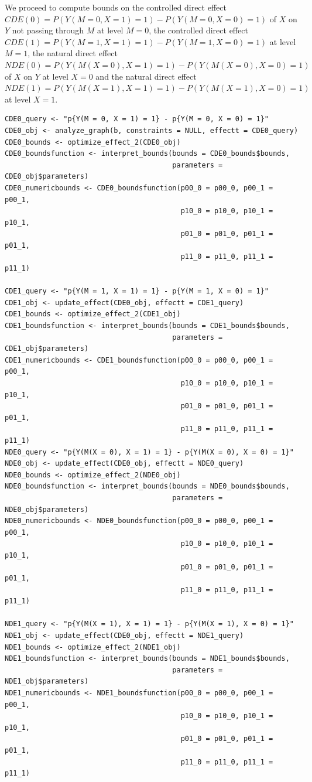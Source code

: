 We proceed to compute bounds on the controlled direct effect \(CDE(0) = P(Y(M = 0, X = 1) = 1) - P(Y(M = 0, X = 0) = 1)\) of \(X\) on \(Y\) not passing through \(M\) at level \(M=0\), the controlled direct effect \(CDE(1) = P(Y(M = 1, X = 1) = 1) - P(Y(M = 1, X = 0) = 1)\) at level \(M=1\), the natural direct effect \(NDE(0) = P(Y(M(X = 0), X = 1) = 1) - P(Y(M(X = 0), X = 0) = 1)\) of \(X\) on \(Y\) at level \(X=0\) and the natural direct effect \(NDE(1) = P(Y(M(X = 1), X = 1) = 1) - P(Y(M(X = 1), X = 0) = 1)\) at level \(X=1\).

\begin{verbatim}
CDE0_query <- "p{Y(M = 0, X = 1) = 1} - p{Y(M = 0, X = 0) = 1}"
CDE0_obj <- analyze_graph(b, constraints = NULL, effectt = CDE0_query)
CDE0_bounds <- optimize_effect_2(CDE0_obj)
CDE0_boundsfunction <- interpret_bounds(bounds = CDE0_bounds$bounds, 
                                        parameters = CDE0_obj$parameters)
CDE0_numericbounds <- CDE0_boundsfunction(p00_0 = p00_0, p00_1 = p00_1, 
                                          p10_0 = p10_0, p10_1 = p10_1, 
                                          p01_0 = p01_0, p01_1 = p01_1, 
                                          p11_0 = p11_0, p11_1 = p11_1)

CDE1_query <- "p{Y(M = 1, X = 1) = 1} - p{Y(M = 1, X = 0) = 1}"
CDE1_obj <- update_effect(CDE0_obj, effectt = CDE1_query)
CDE1_bounds <- optimize_effect_2(CDE1_obj)
CDE1_boundsfunction <- interpret_bounds(bounds = CDE1_bounds$bounds, 
                                        parameters = CDE1_obj$parameters)
CDE1_numericbounds <- CDE1_boundsfunction(p00_0 = p00_0, p00_1 = p00_1, 
                                          p10_0 = p10_0, p10_1 = p10_1, 
                                          p01_0 = p01_0, p01_1 = p01_1, 
                                          p11_0 = p11_0, p11_1 = p11_1)
NDE0_query <- "p{Y(M(X = 0), X = 1) = 1} - p{Y(M(X = 0), X = 0) = 1}"
NDE0_obj <- update_effect(CDE0_obj, effectt = NDE0_query)
NDE0_bounds <- optimize_effect_2(NDE0_obj)
NDE0_boundsfunction <- interpret_bounds(bounds = NDE0_bounds$bounds, 
                                        parameters = NDE0_obj$parameters)
NDE0_numericbounds <- NDE0_boundsfunction(p00_0 = p00_0, p00_1 = p00_1, 
                                          p10_0 = p10_0, p10_1 = p10_1, 
                                          p01_0 = p01_0, p01_1 = p01_1, 
                                          p11_0 = p11_0, p11_1 = p11_1)

NDE1_query <- "p{Y(M(X = 1), X = 1) = 1} - p{Y(M(X = 1), X = 0) = 1}"
NDE1_obj <- update_effect(CDE0_obj, effectt = NDE1_query)
NDE1_bounds <- optimize_effect_2(NDE1_obj)
NDE1_boundsfunction <- interpret_bounds(bounds = NDE1_bounds$bounds, 
                                        parameters = NDE1_obj$parameters)
NDE1_numericbounds <- NDE1_boundsfunction(p00_0 = p00_0, p00_1 = p00_1, 
                                          p10_0 = p10_0, p10_1 = p10_1, 
                                          p01_0 = p01_0, p01_1 = p01_1, 
                                          p11_0 = p11_0, p11_1 = p11_1)
\end{verbatim}

